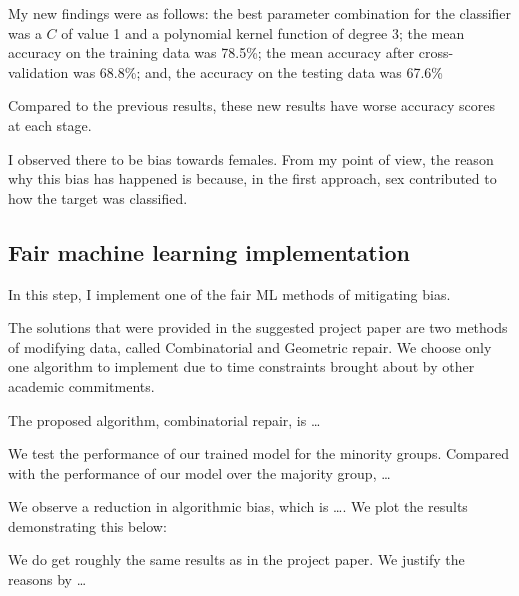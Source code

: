 \documentclass[conference]{IEEEtran}
\begin{document}
My new findings were as follows: the best parameter combination for the classifier was a $C$ of value 1 and a polynomial kernel function of degree 3; the mean accuracy on the training data was 78.5\%; the mean accuracy after cross-validation was 68.8\%; and, the accuracy on the testing data was 67.6\%

Compared to the previous results, these new results have worse accuracy scores at each stage.

I observed there to be bias towards females. From my point of view, the reason why this bias has happened is because, in the first approach, sex contributed to how the target was classified.

\subsection{Fair machine learning implementation}
In this step, I implement one of the fair ML methods of mitigating bias. 

The solutions that were provided in the suggested project paper \cite{Feldman2015ComputationalFP} are two methods of modifying data, called Combinatorial and Geometric repair. We choose only one algorithm to implement due to time constraints brought about by other academic commitments. 

The proposed algorithm, combinatorial repair, is \dots

We test the performance of our trained model for the minority groups. Compared with the performance of our model over the majority group, \dots

We observe a reduction in algorithmic bias, which is \dots. We plot the results demonstrating this below:

We do get roughly the same results as in the project paper. We justify the reasons by \dots



\end{document}
